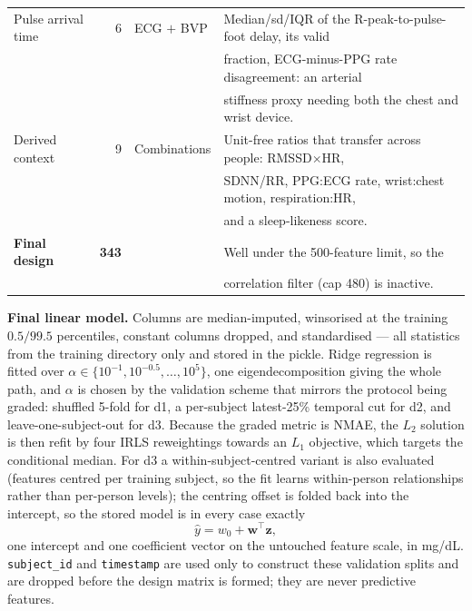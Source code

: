 \documentclass[10pt,a4paper]{article}
\newcommand{\feat}[1]{\texttt{\small #1}}
\begin{document}
\begin{table}[h]
\begin{tabular}{@{}lrll@{}}
Pulse arrival time & 6 & ECG $+$ BVP &
  Median/sd/IQR of the R-peak-to-pulse-foot delay, its valid \\
 & & & fraction, ECG-minus-PPG rate disagreement: an arterial \\
 & & & stiffness proxy needing both the chest and wrist device. \\
\addlinespace
Derived context & 9 & Combinations &
  Unit-free ratios that transfer across people: RMSSD$\times$HR, \\
 & & & SDNN/RR, PPG:ECG rate, wrist:chest motion, respiration:HR, \\
 & & & and a sleep-likeness score. \\
\midrule
\textbf{Final design} & \textbf{343} & & Well under the 500-feature limit, so the \\
 & & & correlation filter (cap 480) is inactive. \\
\bottomrule
\end{tabular}
\end{table}

\textbf{Final linear model.} Columns are median-imputed, winsorised at the
training $0.5/99.5$ percentiles, constant columns dropped, and standardised ---
all statistics from the training directory only and stored in the pickle.
Ridge regression is fitted over $\alpha\in\{10^{-1},10^{-0.5},\dots,10^{5}\}$,
one eigendecomposition giving the whole path, and $\alpha$ is chosen by the
validation scheme that mirrors the protocol being graded: shuffled 5-fold for
d1, a per-subject latest-25\% temporal cut for d2, and leave-one-subject-out for
d3. Because the graded metric is NMAE, the $L_2$ solution is then refit by four
IRLS reweightings towards an $L_1$ objective, which targets the conditional
median. For d3 a within-subject-centred variant is also evaluated (features
centred per training subject, so the fit learns within-person relationships
rather than per-person levels); the centring offset is folded back into the
intercept, so the stored model is in every case exactly
\[
  \hat{y} = w_0 + \mathbf{w}^{\!\top}\mathbf{z},
\]
one intercept and one coefficient vector on the untouched feature scale, in
mg/dL. \feat{subject\_id} and \feat{timestamp} are used only to construct these
validation splits and are dropped before the design matrix is formed; they are
never predictive features.



\end{document}
